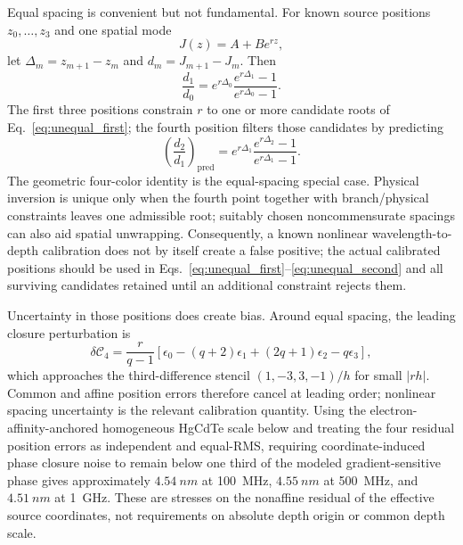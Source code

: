 \documentclass[11pt]{article}
\newcommand{\Cfour}{\mathcal{C}_4}
\begin{document}
Equal spacing is convenient but not fundamental. For known source positions $z_0,\ldots,z_3$ and one spatial mode
\begin{equation}
J(z)=A+B e^{rz},
\end{equation}
let $\Delta_m=z_{m+1}-z_m$ and $d_m=J_{m+1}-J_m$. Then
\begin{equation}
\boxed{
\frac{d_1}{d_0}
=e^{r\Delta_0}
\frac{e^{r\Delta_1}-1}{e^{r\Delta_0}-1}.}
\label{eq:unequal_first}
\end{equation}
The first three positions constrain $r$ to one or more candidate roots of Eq.~\eqref{eq:unequal_first}; the fourth position filters those candidates by predicting
\begin{equation}
\boxed{
\left(\frac{d_2}{d_1}\right)_{\mathrm{pred}}
=e^{r\Delta_1}
\frac{e^{r\Delta_2}-1}{e^{r\Delta_1}-1}.}
\label{eq:unequal_second}
\end{equation}
The geometric four-color identity is the equal-spacing special case. Physical inversion is unique only when the fourth point together with branch/physical constraints leaves one admissible root; suitably chosen noncommensurate spacings can also aid spatial unwrapping. Consequently, a known nonlinear wavelength-to-depth calibration does not by itself create a false positive; the actual calibrated positions should be used in Eqs.~\eqref{eq:unequal_first}--\eqref{eq:unequal_second} and all surviving candidates retained until an additional constraint rejects them.

Uncertainty in those positions does create bias. Around equal spacing, the leading closure perturbation is
\begin{equation}
\delta\Cfour
=\frac{r}{q-1}\left[\epsilon_0-(q+2)\epsilon_1+(2q+1)\epsilon_2-q\epsilon_3\right],
\end{equation}
which approaches the third-difference stencil $(1,-3,3,-1)/h$ for small $|rh|$. Common and affine position errors therefore cancel at leading order; nonlinear spacing uncertainty is the relevant calibration quantity. Using the electron-affinity-anchored homogeneous HgCdTe scale below and treating the four residual position errors as independent and equal-RMS, requiring coordinate-induced phase closure noise to remain below one third of the modeled gradient-sensitive phase gives approximately $4.54~\si{nm}$ at \SI{100}{MHz}, $4.55~\si{nm}$ at \SI{500}{MHz}, and $4.51~\si{nm}$ at \SI{1}{GHz}. These are stresses on the nonaffine residual of the effective source coordinates, not requirements on absolute depth origin or common depth scale.
\end{document}
